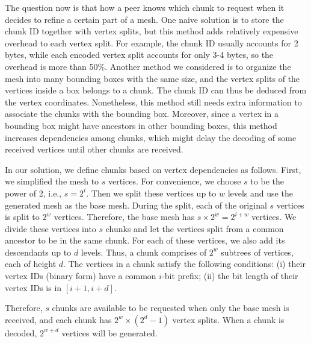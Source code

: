     The question now is that how a peer knows which chunk to request
    when it decides to refine a certain part of a mesh.  
    One naive solution is to store the chunk ID together with vertex
    splits,
    but this method adds %
    relatively expensive overhead to each vertex split. For example, the
    chunk ID usually accounts for 2 bytes, while each encoded vertex
    split accounts for only 3-4 bytes, so the overhead is more than 50\%.
    Another method we considered is to organize the mesh into
    many bounding boxes with the same size, and the vertex splits of the
    vertices inside a box belongs to a chunk. 
    The chunk ID can thus be deduced from the vertex coordinates.
    Nonetheless, this method still needs extra information to
    associate the chunks with the bounding box. %
    Moreover, since a
    vertex in a bounding box might have ancestors in other bounding
    boxes, this method increases dependencies among chunks, which might
    delay the decoding of some received vertices until other chunks are received.

    In our solution, we define chunks based on vertex dependencies as follows.
    First, we simplified the mesh to $s$ vertices. 
    For convenience, we choose $s$ to be the power of 2, i.e., $s = 2^i$.
    Then we split these vertices up to $w$ levels and use the 
    generated mesh as the base mesh. During the split, each of the
    original $s$ vertices is split to $2^w$ vertices. 
    Therefore, the base mesh has 
    $s \times 2^{w}  = 2^{i+w}$
    vertices. 
    We divide these vertices into $s$ chunks and let the vertices
    split from a common ancestor to be in the same chunk.
    For each of these vertices, we also add its descendants up
    to $d$ levels.  Thus, a chunk comprises of $2^w$ subtrees of
    vertices, each of height $d$.
    The vertices in a chunk satisfy the following
    conditions: (i) their vertex IDs (binary form) have a common
    $i$-bit prefix; (ii) the bit length of their vertex IDs is in $[i+1, i+d]$. 

    Therefore,  
    $s$ chunks are available to be requested when only the base mesh is received, 
    and each chunk has
    $2^{w} \times (2^{d} - 1)$
    vertex splits.
    When a chunk is decoded,  $2^{w+d}$
    vertices will be generated. 
    
